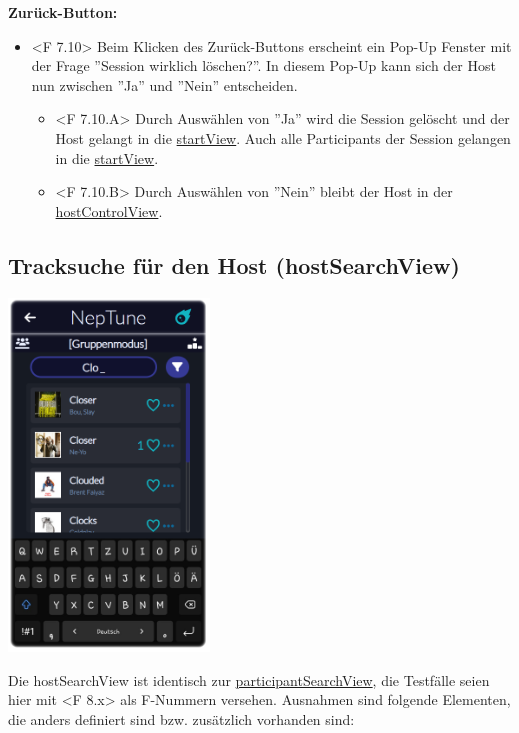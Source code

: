\documentclass[oneside, ngerman]{sdqtechreport}
\begin{document}
\textbf{Zurück-Button:}
\begin{itemize}
    \item <F 7.10> Beim Klicken des Zurück-Buttons erscheint ein Pop-Up Fenster mit der Frage ''Session wirklich löschen?''. In diesem Pop-Up kann sich der Host nun zwischen ''Ja'' und ''Nein'' entscheiden.
    \begin{itemize}
        \item <F 7.10.A> Durch Auswählen von ''Ja'' wird die Session gelöscht und der Host gelangt in die \hyperlink{startView}{startView}. Auch alle Participants der Session gelangen in die \hyperlink{startView}{startView}.
        \item <F 7.10.B> Durch Auswählen von ''Nein'' bleibt der Host in der \hyperlink{hostControlView}{hostControlView}.
    \end{itemize}
\end{itemize}

\subsection{Tracksuche für den Host (hostSearchView)}
\label{sec:Benutzeroberfläche:hostSearchView}


\begin{center}
    \hypertarget{hostSearchView}{}
    \includegraphics[width=0.4\textwidth]{LATEX/Pflichtenheft/GraphicDesigns/hostSearchPage.png}
\end{center}

Die hostSearchView ist identisch zur \hyperlink{participantSearchView}{participantSearchView}, die Testfälle seien hier mit <F 8.x> als F-Nummern versehen. Ausnahmen sind folgende Elementen, die anders definiert sind bzw. zusätzlich vorhanden sind:
\end{document}
